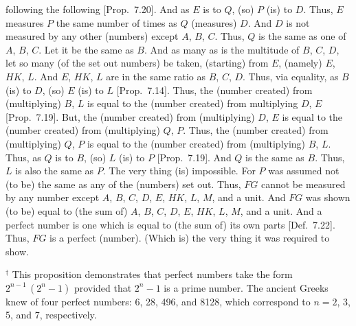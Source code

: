 \begin{Parallel}{}{}
{following the following [Prop.~7.20].
And as $E$ is to $Q$, (so) $P$ (is) to $D$. Thus, $E$ measures $P$ the same number of times as $Q$ (measures) $D$. And $D$ is not measured by any
other (numbers) except $A$, $B$, $C$.  Thus, $Q$ is the same as one
of $A$, $B$, $C$. Let it be the same as $B$. And as many as is the
multitude of $B$, $C$, $D$, let so many (of the set out numbers) be taken, (starting) from $E$, 
(namely) $E$, $HK$, $L$. And $E$, $HK$, $L$ are in the same ratio as
$B$, $C$, $D$. Thus, via equality, as $B$ (is) to $D$, (so) $E$ (is) to $L$
[Prop.~7.14]. Thus, the (number created) from
(multiplying) $B$, $L$ is equal to the (number created) from multiplying
$D$, $E$ [Prop.~7.19]. But, the (number created)
from (multiplying) $D$, $E$ is equal to the (number created) from (multiplying)
$Q$, $P$. Thus, the (number created) from (multiplying) $Q$, $P$
is equal to the (number created) from (multiplying) $B$, $L$. Thus, as
$Q$ is to $B$, (so) $L$ (is) to $P$ [Prop.~7.19]. 
And $Q$ is the same as $B$. Thus, $L$ is also the same as $P$. The
very thing (is) impossible. For $P$ was assumed not (to be) the same
as any of the (numbers) set out. Thus, $FG$ cannot be measured by any number except $A$, $B$, $C$, $D$, $E$, $HK$, $L$, $M$, and a unit.
And $FG$ was shown (to be) equal to (the sum of) $A$, $B$, $C$, $D$, $E$, $HK$,
$L$, $M$, and a unit. And a perfect number is one which is equal to (the sum of) its own
parts [Def.~7.22]. Thus, $FG$ is a perfect (number).
(Which is) the very thing it was required to show.}
\end{Parallel}
{\footnotesize\noindent$^\dag$ This proposition demonstrates that perfect
numbers take the form $2^{n-1}\,(2^n-1)$ provided that $2^n-1$ is a prime
number. The ancient Greeks knew of four perfect numbers: 6, 28, 496, and
8128, which correspond to $n= 2$, 3, 5, and 7, respectively.}
